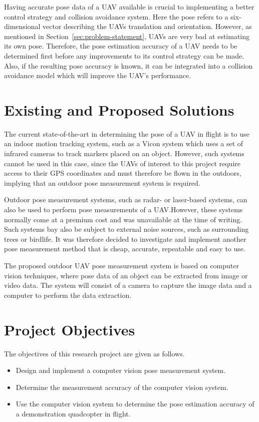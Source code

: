 Having accurate pose data of a UAV available is crucial to implementing a better control strategy and collision avoidance system. Here the pose refers to a six-dimensional vector describing the UAVs translation and orientation. However, as mentioned in Section~\ref{sec:problem-statement}, UAVs are very bad at estimating its own pose. Therefore, the pose estimation accuracy of a UAV needs to be determined first before any improvements to its control strategy can be made. Also, if the resulting pose accuracy is known, it can be integrated into a collision avoidance model which will improve the UAV's performance. 

\section{Existing and Proposed Solutions}

The current state-of-the-art in determining the pose of a UAV in flight is to use an indoor motion tracking system, such as a Vicon system which uses a set of infrared cameras to track markers placed on an object. However, such systems cannot be used in this case, since the UAVs of interest to this project require access to their GPS coordinates and must therefore be flown in the outdoors, implying that an outdoor pose measurement system is required. 

Outdoor pose measurement systems, such as radar- or laser-based systems, can also be used to perform pose measurements of a UAV.\@ However, these systems normally come at a premium cost  and was unavailable at the time of writing. Such systems bay also be subject to external noise sources, such as surrounding trees or birdlife. It was therefore decided to investigate and implement another pose measurement method that is cheap, accurate, repeatable and easy to use. 

The proposed outdoor UAV pose measurement system is based on computer vision techniques, where pose data of an object can be extracted from image or video data. The system will consist of a camera to capture the image data and a computer to perform the data extraction. 

\section{Project Objectives}

The objectives of this research project are given as follows. 

\begin{itemize}
  \item Design and implement a computer vision pose measurement system.
  \item Determine the measurement accuracy of the computer vision system.
  \item Use the computer vision system to determine the pose estimation accuracy of a demonstration quadcopter in flight. 
\end{itemize}

